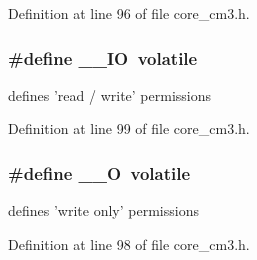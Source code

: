 \-Definition at line 96 of file core\-\_\-cm3.\-h.

\hypertarget{group___c_m_s_i_s__core__definitions_gaec43007d9998a0a0e01faede4133d6be}{
\subsubsection[{\-\_\-\-\_\-\-I\-O}]{\setlength{\rightskip}{0pt plus 5cm}\#define {\bf \-\_\-\-\_\-\-I\-O}~volatile}}\label{group___c_m_s_i_s__core__definitions_gaec43007d9998a0a0e01faede4133d6be}
defines 'read / write' permissions 

\-Definition at line 99 of file core\-\_\-cm3.\-h.

\hypertarget{group___c_m_s_i_s__core__definitions_ga7e25d9380f9ef903923964322e71f2f6}{
\subsubsection[{\-\_\-\-\_\-\-O}]{\setlength{\rightskip}{0pt plus 5cm}\#define {\bf \-\_\-\-\_\-\-O}~volatile}}\label{group___c_m_s_i_s__core__definitions_ga7e25d9380f9ef903923964322e71f2f6}
defines 'write only' permissions 

\-Definition at line 98 of file core\-\_\-cm3.\-h.

